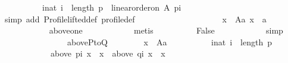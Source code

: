 \begin{isabellebody}
\isanewline
\ \ \ \ \ \ \ \ \ \ {\isachardoublequoteopen}{\isasymforall}i{\isacharcolon}{\kern0pt}{\isacharcolon}{\kern0pt}nat{\isachardot}{\kern0pt}\ i\ {\isacharless}{\kern0pt}\ length\ p\ {\isasymlongrightarrow}\ linear{\isacharunderscore}{\kern0pt}order{\isacharunderscore}{\kern0pt}on\ A\ {\isacharparenleft}{\kern0pt}p{\isacharbang}{\kern0pt}i{\isacharparenright}{\kern0pt}{\isachardoublequoteclose}\isanewline
\ \ \ \ \ \ \ \ \ \ \isamarkupfalse%
\ {\isacharparenleft}{\kern0pt}simp\ add{\isacharcolon}{\kern0pt}\ Profile{\isachardot}{\kern0pt}lifted{\isacharunderscore}{\kern0pt}def\ profile{\isacharunderscore}{\kern0pt}def{\isacharparenright}{\kern0pt}\isanewline
\ \ \ \ \ \ \ \ \isamarkupfalse%
\ \isamarkupfalse%
\isanewline
\ \ \ \ \ \ \ \ \ \ {\isachardoublequoteopen}{\isasymexists}x\ {\isasymin}\ A{\isacharminus}{\kern0pt}{\isacharbraceleft}{\kern0pt}a{\isacharbraceright}{\kern0pt}{\isachardot}{\kern0pt}\ x\ {\isacharequal}{\kern0pt}\ a{\isachardoublequoteclose}\isanewline
\ \ \ \ \ \ \ \ \ \ \isamarkupfalse%
\ above{\isacharunderscore}{\kern0pt}one{}\isanewline
\ \ \ \ \ \ \ \ \ \ \isamarkupfalse%
\ metis\isanewline
\ \ \ \ \ \ \ \ \isamarkupfalse%
\ {\isachardoublequoteopen}False{\isachardoublequoteclose}\isanewline
\ \ \ \ \ \ \ \ \ \ \isamarkupfalse%
\ simp\isanewline
\ \ \ \ \ \ \isamarkupfalse%
\isanewline
\ \ \ \ \ \ \isamarkupfalse%
\ \isamarkupfalse%
\ above{\isacharunderscore}{\kern0pt}PtoQ{\isacharcolon}{\kern0pt}\isanewline
\ \ \ \ \ \ \ \ {\isachardoublequoteopen}{\isasymforall}x\ {\isasymin}\ A{\isacharminus}{\kern0pt}{\isacharbraceleft}{\kern0pt}a{\isacharbraceright}{\kern0pt}{\isachardot}{\kern0pt}\isanewline
\ \ \ \ \ \ \ \ \ \ {\isasymforall}i{\isacharcolon}{\kern0pt}{\isacharcolon}{\kern0pt}nat{\isachardot}{\kern0pt}\ i\ {\isacharless}{\kern0pt}\ length\ p\ {\isasymlongrightarrow}\isanewline
\ \ \ \ \ \ \ \ \ \ \ \ {\isacharparenleft}{\kern0pt}above\ {\isacharparenleft}{\kern0pt}p{\isacharbang}{\kern0pt}i{\isacharparenright}{\kern0pt}\ x\ {\isacharequal}{\kern0pt}\ {\isacharbraceleft}{\kern0pt}x{\isacharbraceright}{\kern0pt}\ {\isasymlongrightarrow}\ above\ {\isacharparenleft}{\kern0pt}q{\isacharbang}{\kern0pt}i{\isacharparenright}{\kern0pt}\ x\ {\isacharequal}{\kern0pt}\ {\isacharbraceleft}{\kern0pt}x{\isacharbraceright}{\kern0pt}{\isacharparenright}{\kern0pt}{\isachardoublequoteclose}\isanewline
\ \ \ \ \ \ \ \ \isamarkupfalse%

\end{isabellebody}
